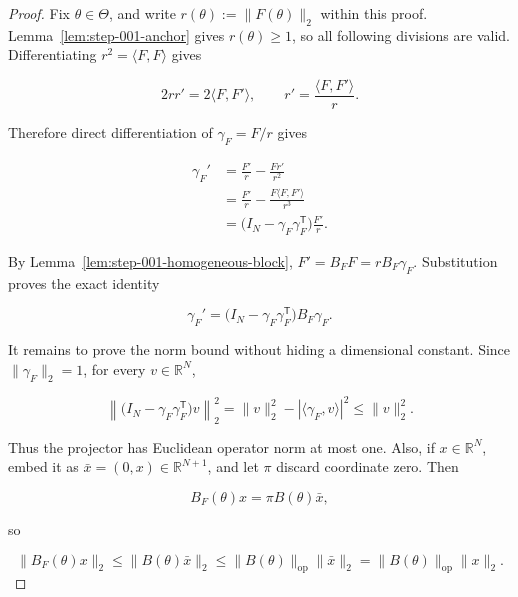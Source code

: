 \begin{proof}
Fix \(\theta\in\Theta\), and write
\(r(\theta):=\|F(\theta)\|_2\) within this proof. Lemma~\ref{lem:step-001-anchor} gives \(r(\theta)\geq1\), so
all following divisions are valid. Differentiating \(r^2=\langle F,F\rangle\) gives

\begin{equation}
\label{eq:appendix-display-015}
2rr'=2\langle F,F'\rangle,
\qquad
r'=\frac{\langle F,F'\rangle}{r}.
\end{equation}

Therefore direct differentiation of \(\gamma_F=F/r\) gives

\begin{equation}
\label{eq:appendix-display-016}
\begin{aligned}
\gamma_F'
&=\frac{F'}{r}-\frac{F r'}{r^2}\\
&=\frac{F'}{r}-\frac{F\langle F,F'\rangle}{r^3}\\
&=\bigl(I_N-\gamma_F\gamma_F^{\mathsf T}\bigr)\frac{F'}{r}.
\end{aligned}
\end{equation}

By Lemma~\ref{lem:step-001-homogeneous-block},
\(F'=B_FF=rB_F\gamma_F\). Substitution proves the exact identity

\begin{equation}
\label{eq:appendix-display-017}
\gamma_F'
=\bigl(I_N-\gamma_F\gamma_F^{\mathsf T}\bigr)B_F\gamma_F.
\end{equation}

It remains to prove the norm bound without hiding a dimensional constant. Since \(\|\gamma_F\|_2=1\), for every
\(v\in\mathbb R^N\),

\begin{equation}
\label{eq:appendix-display-018}
\left\|\bigl(I_N-\gamma_F\gamma_F^{\mathsf T}\bigr)v\right\|_2^2
=\|v\|_2^2-|\langle\gamma_F,v\rangle|^2
\leq\|v\|_2^2.
\end{equation}

Thus the projector has Euclidean operator norm at most one. Also, if \(x\in\mathbb R^N\), embed it as
\(\bar x=(0,x)\in\mathbb R^{N+1}\), and let \(\pi\) discard coordinate zero. Then

\begin{equation}
\label{eq:appendix-display-019}
B_F(\theta)x=\pi B(\theta)\bar x,
\end{equation}

so

\begin{equation}
\label{eq:appendix-display-020}
\|B_F(\theta)x\|_2
\leq\|B(\theta)\bar x\|_2
\leq\|B(\theta)\|_{\mathrm{op}}\|\bar x\|_2
=\|B(\theta)\|_{\mathrm{op}}\|x\|_2.
\end{equation}


\end{proof}
